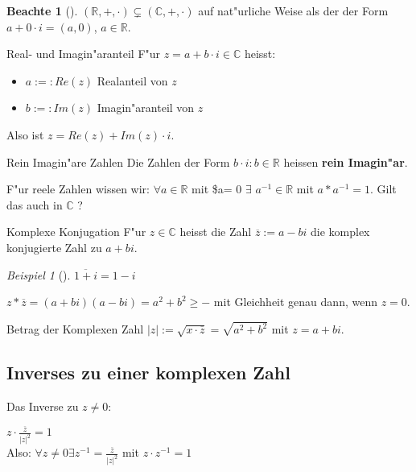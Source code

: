 \documentclass[11pt]{article}
\theoremstyle{remark}
\newtheorem{exa}{Beispiel}[section]
\theoremstyle{definition}
\newtheorem*{notte}{Beachte}
\theoremstyle{remark}
\begin{document}
\begin{notte}[] \label{}
\((\mathbb{R},+,\cdot)\subsetneq (\mathbb{C},+,\cdot)\) auf nat"urliche Weise als
der der Form \(a+0\cdot i = (a,0)\), \(a\in \mathbb{R}\).
\end{notte}

\begin{definition}{Real- und Imagin"aranteil}{}
F"ur \(z=a+b\cdot i\in \mathbb{C}\) heisst:
\begin{itemize}
\item \(a:=:Re(z)\) Realanteil von \(z\)
\item \(b:=:Im(z)\) Imagin"aranteil von \(z\)
\end{itemize}

Also ist \(z=Re(z)+ Im(z)\cdot i\).
\end{definition}

\begin{definition}{Rein Imagin"are Zahlen}{}
Die Zahlen der Form \(b\cdot i : b\in \mathbb{R}\) heissen \textbf{rein Imagin"ar}.
\end{definition}

F"ur reele Zahlen wissen wir: \(\forall a\in \mathbb{R}\) mit \$a\textlnot{}= 0 \(\exists\)
\(a^{-1} \in \mathbb{R}\) mit \(a*a^{-1}=1\). Gilt das auch in \(\mathbb{C}\) ?

\begin{definition}{Komplexe Konjugation}{}
F"ur \(z\in \mathbb{C}\) heisst die Zahl \(\overline{z}:=a-bi\) die komplex
konjugierte Zahl zu \(a+bi\).
\end{definition}

\begin{exa}[] \label{}
\(\overline{1+i}=1-i\)
\end{exa}

\begin{relation}
\(z*\overline{z}=(a+bi)(a-bi)=a^2+b^2\geq -\) mit Gleichheit genau dann, wenn \(z=0\).
\end{relation}

\begin{definition}{Betrag der Komplexen Zahl}{}
\(|z|:=\sqrt{x\cdot \overline{z}}=\sqrt{a^2+b^2}\) mit \(z=a+bi\).
\end{definition}

\subsection{Inverses zu einer komplexen Zahl}
\label{sec:org0018acd}
Das Inverse zu \(z\not= 0\):
\begin{relation}
\(z\cdot \frac{\overline{z}}{|z|^2}=1\) \\
Also: \(\forall z\not= 0 \exists z^{-1} = \frac{\overline{z}}{|z|^2}\) mit \(z \cdot z^{-1}=1\)
\end{relation}
\end{document}

